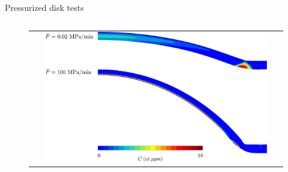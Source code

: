\documentclass[9pt]{beamer}
\begin{document}
\begin{frame}{Pressurized disk tests}
\begin{columns}
        \begin{column}{0.55\textwidth}
            \begin{figure}
                \begin{tabular}{c}
                    \includegraphics[width=0.9\textwidth]{Images/C_P_rate.pdf}\\
                \end{tabular}
            \end{figure}
        \end{column}
    
    \end{columns}   
    
\end{frame}

\end{document}
